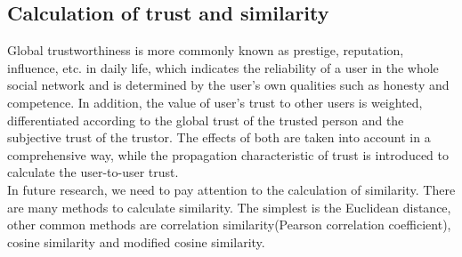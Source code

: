 \subsection{Calculation of trust and similarity}
Global trustworthiness is more commonly known as prestige, reputation, influence, etc. in 
daily life, which indicates the reliability of a user in the whole social network and is 
determined by the user's own qualities such as honesty and competence\cite{b25}. In addition, the 
value of user's trust to other users is weighted, differentiated according to the global 
trust of the trusted person and the subjective trust of the trustor. The effects of both 
are taken into account in a comprehensive way, while the propagation characteristic of trust 
is introduced to calculate the user-to-user trust\cite{b26}.
\\
In future research, we need to pay attention to the calculation of similarity. 
There are many methods to calculate similarity. The simplest is the Euclidean distance,
other common methods are correlation similarity(Pearson correlation coefficient),
cosine similarity and modified cosine similarity\cite{b15}.